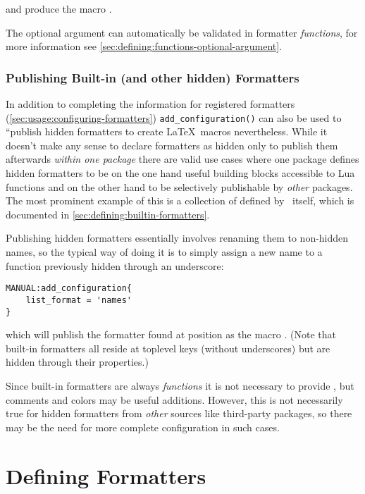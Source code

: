 \documentclass[12pt]{scrartcl}
\begin{document}
\noindent and produce the macro \texttt{}.

The optional argument can automatically be validated in formatter
\emph{functions}, for more information see
\vref{sec:defining:functions-optional-argument}.

\subsubsection{Publishing Built-in (and other hidden) Formatters}
\label{sec:usage:publishing-builtin-formatters}

In addition to completing the information for registered formatters
(\vref{sec:usage:configuring-formatters}) \texttt{add_configuration()} can
also be used to “publish hidden formatters to create \LaTeX\ macros
nevertheless.  While it doesn't make any sense to declare formatters as hidden
only to publish them afterwards \emph{within one package} there are valid use
cases where one package defines hidden formatters to be on the one hand useful
building blocks accessible to Lua functions and on the other hand to be
selectively publishable by \emph{other} packages.  The most prominent example of
this is a collection of  defined by
\luaformatters\ itself, which is documented in
\vref{sec:defining:builtin-formatters}.

Publishing hidden formatters essentially involves renaming them to non-hidden names, so the typical way of doing it is to simply assign a new name to a function previously hidden through an underscore:

\begin{verbatim}
MANUAL:add_configuration{
	list_format = 'names'
}
\end{verbatim}

\noindent which will publish the formatter found at position  as the macro .  (Note that built-in formatters all reside at toplevel keys (without underscores) but are hidden through their  properties.)

Since built-in formatters are always \emph{functions} it is not necessary to
provide , but comments and colors may be useful additions.
However, this is not necessarily true for hidden formatters from \emph{other}
sources like third-party packages, so there may be the need for more complete
configuration in such cases.


\section{Defining Formatters}
\label{sec:defining-formatters}
\end{document}
